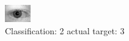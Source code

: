 \begin{figure}[h!]
\begin{center}
\includegraphics[width=0.60\columnwidth]{figures/ID653_class_2_target_3.png}
\end{center}
\caption{ Classification: 2 actual target: 3}
\label{fig:ID653_class_2_target_3}
\end{figure}
